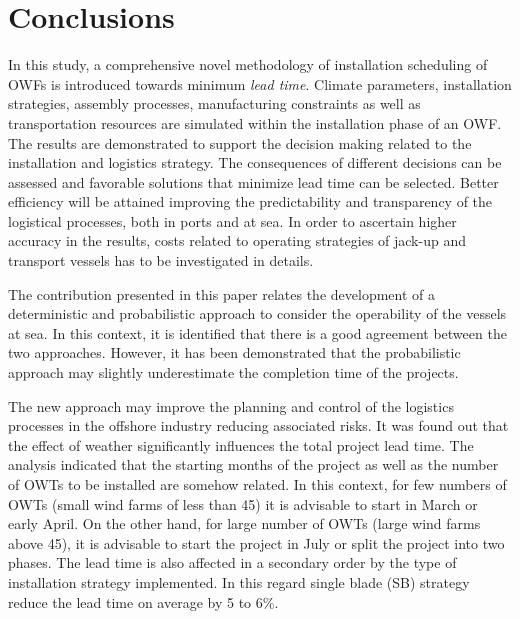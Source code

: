 \section{Conclusions}
\label{conclusions}


In this study, a comprehensive novel methodology of installation scheduling of OWFs is introduced towards minimum \textit{lead time}. Climate parameters, installation strategies, assembly processes, manufacturing constraints as well as transportation resources are simulated within the installation phase of an OWF. The results are demonstrated to support the decision making related to the installation and logistics strategy. The consequences of different decisions can be assessed and favorable solutions that minimize lead time can be selected. Better efficiency will be attained improving the predictability and transparency of the logistical processes, both in ports and at sea. In order to ascertain higher accuracy in the results, costs related to operating strategies of jack-up and transport vessels has to be investigated in details.

The contribution presented in this paper relates the development of a deterministic and probabilistic approach to consider the operability of the vessels at sea. In this context, it is identified that there is a good agreement between the two approaches. However, it has been demonstrated that the probabilistic approach may slightly underestimate the completion time of the projects.

The new approach may improve the planning and control of the logistics processes in the offshore industry reducing associated risks. It was found out that the effect of weather significantly influences the total project lead time. The analysis indicated that the starting months of the project as well as the number of OWTs to be installed are somehow related. In this context, for few numbers of OWTs (small wind farms of less than 45) it is advisable to start in March or early April. On the other hand, for large number of OWTs (large wind farms above 45), it is advisable to start the project in July or split the project into two phases. The lead time is also affected in a secondary order by the type of installation strategy implemented. In this regard single blade (SB) strategy reduce the lead time on average by 5 to 6\%.

